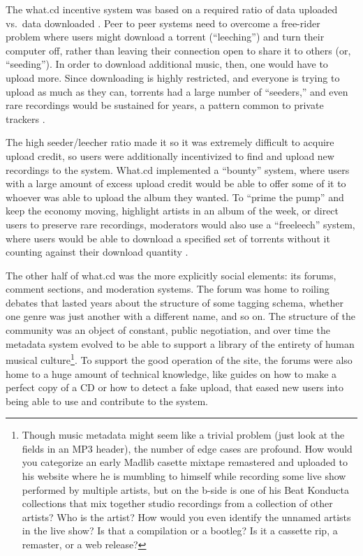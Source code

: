The what.cd incentive system was based on a required ratio of data
uploaded vs.~data downloaded \citep{jiaHowSurviveThrive2013} .
Peer to peer systems need to overcome a free-rider problem where users
might download a torrent (``leeching'') and turn their computer off,
rather than leaving their connection open to share it to others (or,
``seeding''). In order to download additional music, then, one would
have to upload more. Since downloading is highly restricted, and
everyone is trying to upload as much as they can, torrents had a large
number of ``seeders,'' and even rare recordings would be sustained for
years, a pattern common to private trackers \citep{liuUnderstandingImprovingRatio2010} .

The high seeder/leecher ratio made it so it was extremely difficult to
acquire upload credit, so users were additionally incentivized to find
and upload new recordings to the system. What.cd implemented a
``bounty'' system, where users with a large amount of excess upload
credit would be able to offer some of it to whoever was able to upload
the album they wanted. To ``prime the pump'' and keep the economy
moving, highlight artists in an album of the week, or direct users to
preserve rare recordings, moderators would also use a ``freeleech''
system, where users would be able to download a specified set of
torrents without it counting against their download quantity \citep{kashEconomicsBitTorrentCommunities2012, chenImprovingSustainabilityPrivate2011a} .

The other half of what.cd was the more explicitly social elements: its
forums, comment sections, and moderation systems. The forum was home to
roiling debates that lasted years about the structure of some tagging
schema, whether one genre was just another with a different name, and so
on. The structure of the community was an object of constant, public
negotiation, and over time the metadata system evolved to be able to
support a library of the entirety of human musical culture\footnote{Though
  music metadata might seem like a trivial problem (just look at the
  fields in an MP3 header), the number of edge cases are profound. How
  would you categorize an early Madlib casette mixtape remastered and
  uploaded to his website where he is mumbling to himself while
  recording some live show performed by multiple artists, but on the
  b-side is one of his Beat Konducta collections that mix together
  studio recordings from a collection of other artists? Who is the
  artist? How would you even identify the unnamed artists in the live
  show? Is that a compilation or a bootleg? Is it a cassette rip, a
  remaster, or a web release?}. To support the good operation of the
site, the forums were also home to a huge amount of technical knowledge,
like guides on how to make a perfect copy of a CD or how to detect a
fake upload, that eased new users into being able to use and contribute
to the system.

